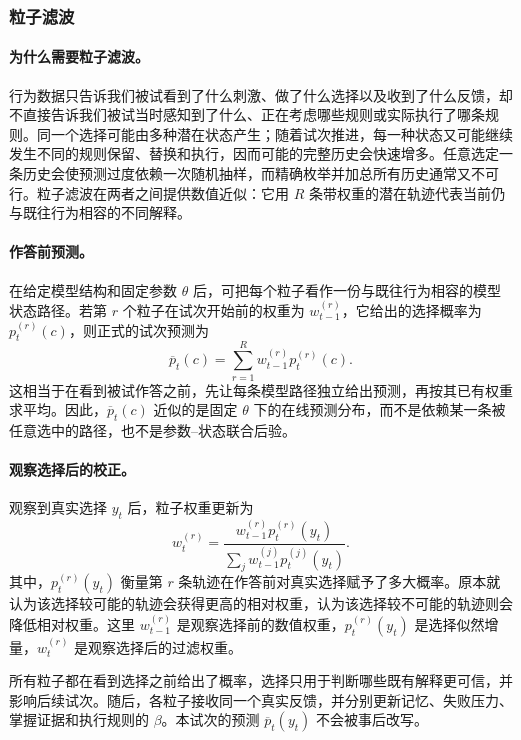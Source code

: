 \subsubsection{粒子滤波}

\paragraph{为什么需要粒子滤波。}
行为数据只告诉我们被试看到了什么刺激、做了什么选择以及收到了什么反馈，却不直接告诉我们被试当时感知到了什么、正在考虑哪些规则或实际执行了哪条规则。同一个选择可能由多种潜在状态产生；随着试次推进，每一种状态又可能继续发生不同的规则保留、替换和执行，因而可能的完整历史会快速增多。任意选定一条历史会使预测过度依赖一次随机抽样，而精确枚举并加总所有历史通常又不可行。粒子滤波在两者之间提供数值近似：它用 $R$ 条带权重的潜在轨迹代表当前仍与既往行为相容的不同解释。

\paragraph{作答前预测。}
在给定模型结构和固定参数 $\theta$ 后，可把每个粒子看作一份与既往行为相容的模型状态路径。若第 $r$ 个粒子在试次开始前的权重为 $w_{t-1}^{(r)}$，它给出的选择概率为 $p_t^{(r)}(c)$，则正式的试次预测为
\begin{equation}
\overline p_t(c)
=\sum_{r=1}^{R}w_{t-1}^{(r)}p_t^{(r)}(c).
\label{eq:dynamic-pf-marginal}
\end{equation}
这相当于在看到被试作答之前，先让每条模型路径独立给出预测，再按其已有权重求平均。因此，$\overline p_t(c)$ 近似的是固定 $\theta$ 下的在线预测分布，而不是依赖某一条被任意选中的路径，也不是参数--状态联合后验。

\paragraph{观察选择后的校正。}
观察到真实选择 $y_t$ 后，粒子权重更新为
\begin{equation}
w_t^{(r)}
=
\frac{w_{t-1}^{(r)}p_t^{(r)}(y_t)}
{\sum_jw_{t-1}^{(j)}p_t^{(j)}(y_t)}.
\label{eq:dynamic-pf-weight}
\end{equation}
其中，$p_t^{(r)}(y_t)$ 衡量第 $r$ 条轨迹在作答前对真实选择赋予了多大概率。原本就认为该选择较可能的轨迹会获得更高的相对权重，认为该选择较不可能的轨迹则会降低相对权重。这里 $w_{t-1}^{(r)}$ 是观察选择前的数值权重，$p_t^{(r)}(y_t)$ 是选择似然增量，$w_t^{(r)}$ 是观察选择后的过滤权重。

所有粒子都在看到选择之前给出了概率，选择只用于判断哪些既有解释更可信，并影响后续试次。随后，各粒子接收同一个真实反馈，并分别更新记忆、失败压力、掌握证据和执行规则的 $\beta$。本试次的预测 $\overline p_t(y_t)$ 不会被事后改写。

